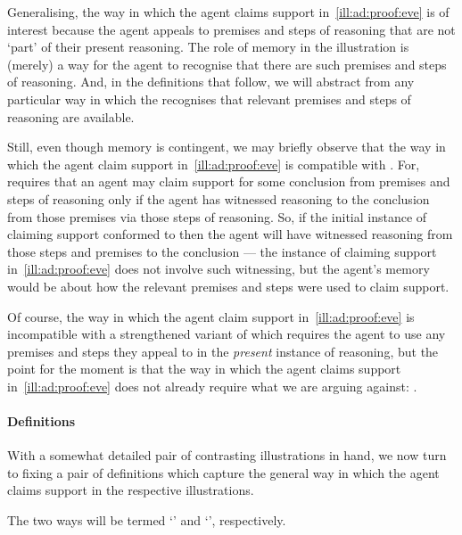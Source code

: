 \begin{note}
  Generalising, the way in which the agent claims support in~\autoref{ill:ad:proof:eve} is of interest because the agent appeals to premises and steps of reasoning that are not `part' of their present reasoning.
  The role of memory in the illustration is (merely) a way for the agent to recognise that there are such premises and steps of reasoning.
  And, in the definitions that follow, we will abstract from any particular way in which the recognises that relevant premises and steps of reasoning are available.

  Still, even though memory is contingent, we may briefly observe that the way in which the agent claim support in~\autoref{ill:ad:proof:eve} is compatible with \ESU{}.
  For, \ESU{} requires that an agent may claim support for some conclusion from premises and steps of reasoning only if the agent has witnessed reasoning to the conclusion from those premises via those steps of reasoning.
  So, if the initial instance of claiming support conformed to \ESU{} then the agent will have witnessed reasoning from those steps and premises to the conclusion --- the instance of claiming support in~\autoref{ill:ad:proof:eve} does not involve such witnessing, but the agent's memory would be about how the relevant premises and steps were used to claim support.

  Of course, the way in which the agent claim support in~\autoref{ill:ad:proof:eve} is incompatible with a strengthened variant of \ESU{} which requires the agent to use any premises and steps they appeal to in the \emph{present} instance of reasoning, but the point for the moment is that the way in which the agent claims support in~\autoref{ill:ad:proof:eve} does not already require what we are arguing against: \ESU{}.
\end{note}

\paragraph{Definitions}

\begin{note}
  With a somewhat detailed pair of contrasting illustrations in hand, we now turn to fixing a pair of definitions which capture the general way in which the agent claims support in the respective illustrations.

  The two ways will be termed `\adA{}' and `\adB{}', respectively.
\end{note}

